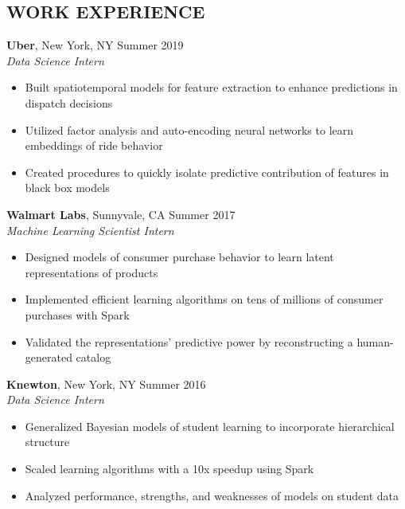 \documentclass{res}
\begin{document}
\begin{resume}
\section{WORK EXPERIENCE}
\textbf{Uber}, New York, NY \hfill{Summer 2019}\\
\textit{Data Science Intern}
\begin{itemize}
\item Built spatiotemporal models for feature extraction to enhance predictions in dispatch decisions
\item Utilized factor analysis and auto-encoding neural networks to learn embeddings of ride behavior
\item Created procedures to quickly isolate predictive contribution of features in black box  models
\end{itemize}
\vspace{-2mm}  
\textbf{Walmart Labs}, Sunnyvale, CA \hfill{Summer 2017}\\
\textit{Machine Learning Scientist Intern}
\begin{itemize}
\item Designed models of consumer purchase behavior to learn latent representations of products
\item Implemented efficient learning algorithms on tens of millions of consumer purchases with Spark
\item Validated the representations' predictive power by reconstructing a human-generated catalog
\end{itemize}


\textbf{Knewton}, New York, NY \hfill{Summer 2016}\\
\textit{Data Science Intern}
\begin{itemize}
\item Generalized Bayesian models of student learning to incorporate hierarchical structure 
\item Scaled learning algorithms with a 10x speedup using Spark
\item Analyzed performance, strengths, and weaknesses of models on student data
\end{itemize}




\end{resume}
\end{document}
